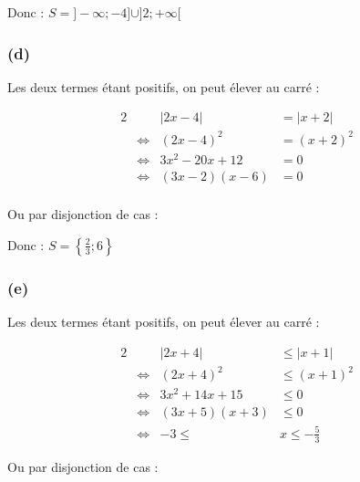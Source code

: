 \documentclass[a4paper,10pt]{report}
\begin{document}
Donc : $S=]-\infty ; -4] \cup ]2 ; +\infty[$

\subsubsection*{(d)}


Les deux termes étant positifs, on peut élever au carré :

\begin{alignat*}{2}
	&                    & |2x-4| &= |x+2| \\
	&\Longleftrightarrow &(2x-4)^2 &= (x+2)^2 \\
	&\Longleftrightarrow & 3x^2 -20x +12 & =0 \\
	&\Longleftrightarrow & (3x-2)(x-6) &= 0\\
\end{alignat*}


Ou par disjonction de cas :


Donc : $S=\left\lbrace \frac{2}{3} ; 6 \right\rbrace$

\subsubsection*{(e)}

Les deux termes étant positifs, on peut élever au carré :

\begin{alignat*}{2}
	&                    & |2x+4|        &\leq |x+1| \\
	&\Longleftrightarrow & (2x+4)^2      &\leq (x+1)^2 \\
	&\Longleftrightarrow & 3x^2 +14x +15 &\leq 0 \\
	&\Longleftrightarrow & (3x+5)(x+3)   &\leq 0 \\
	&\Longleftrightarrow & -3 \leq &x \leq -\frac{5}{3}
\end{alignat*}

Ou par disjonction de cas :

\end{document}

